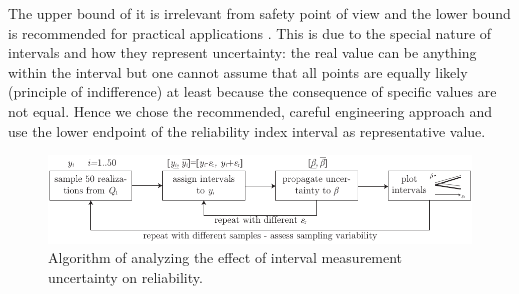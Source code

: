 The upper bound of it is irrelevant from safety point of view and the lower bound is recommended for practical applications \citep{Qiu2007}. This is due to the special nature of intervals and how they represent uncertainty: the real value can be anything within the interval but one cannot assume that all points are equally likely (principle of indifference) at least because the consequence of specific values are not equal. Hence we chose the recommended, careful engineering approach and use the lower endpoint of the reliability index interval as representative value.
\begin{figure}[htbp!] 
	\centering    
	\includegraphics[]{interval_analysis_algorithm_.pdf}
	\caption{Algorithm of analyzing the effect of interval measurement uncertainty on reliability.}
	\label{fig:int_alg}
\end{figure}

